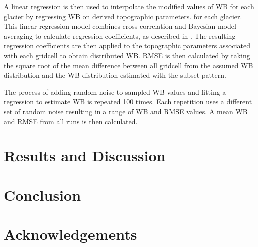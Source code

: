 \documentclass[twocolumn,letterpaper]{igs}
\begin{document}
A linear regression is then used to interpolate the modified values of WB for each glacier by regressing WB on derived topographic parameters. for each glacier. This linear regression model combines cross correlation and Bayesian model averaging to calculate regression coefficients, as described in \cite{Pulwicki2017}. The resulting regression coefficients are then applied to the topographic parameters associated with each gridcell to obtain distributed WB. RMSE is then calculated by taking the square root of the mean difference between all gridcell from the assumed WB distribution and the WB distribution estimated with the subset pattern.

The process of adding random noise to sampled WB values and fitting a regression to estimate WB is repeated 100 times. Each repetition uses a different set of random noise resulting in a range of WB and RMSE values. A mean WB and RMSE from all runs is then calculated. 


\section{Results and Discussion}

%
%
%
%
%
%

\section{Conclusion}


\section{Acknowledgements}
\end{document}
